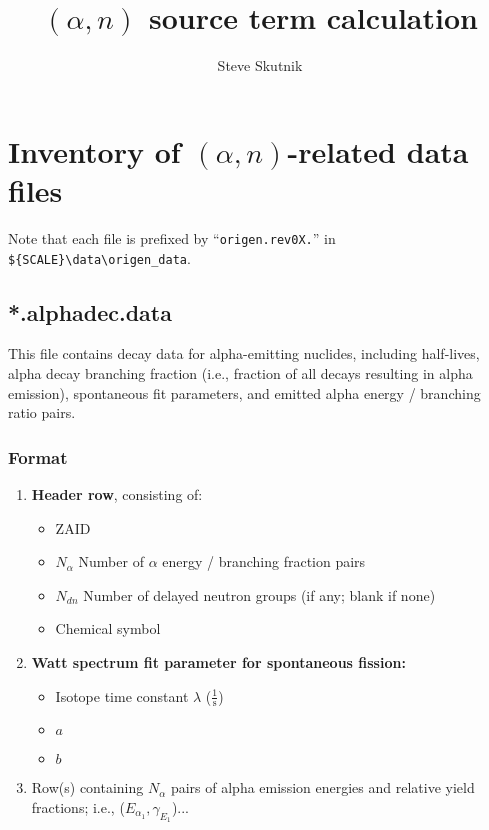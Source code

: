 \documentclass[10pt]{article}
\newcommand{\alphn}[0]{$\left(\alpha,n\right)$}
\begin{document}
\title{$\left( \alpha, n \right)$ source term calculation}
\author{Steve Skutnik}
\maketitle 

\section{Inventory of \alphn-related data files}

Note that each file is prefixed by ``\texttt{origen.rev0X.}'' in \texttt{\$\{SCALE\}\textbackslash data\textbackslash origen\_data}.

\subsection{*.alphadec.data}

This file contains decay data for alpha-emitting nuclides, including half-lives, alpha decay branching fraction (i.e., fraction of all decays resulting in alpha emission), spontaneous fit parameters, and emitted alpha energy / branching ratio pairs.

\subsubsection{Format}
\begin{enumerate}
\item \textbf{Header row}, consisting of:
\begin{itemize}
\item ZAID
\item $N_{\alpha}$ Number of $\alpha$ energy / branching fraction pairs
\item $N_{dn}$ Number of delayed neutron groups (if any; blank if none)
\item Chemical symbol
\end{itemize}
\item \textbf{Watt spectrum fit parameter for spontaneous fission:}
\begin{itemize}
\item Isotope time constant $\lambda$ ($\frac{1}{\mathrm{s}}$)
\item $a$
\item $b$
\end{itemize}
\item Row(s) containing $N_{\alpha}$ pairs of alpha emission energies and relative yield fractions; i.e., ($E_{\alpha_1}, \gamma_{E_1}$)...
\end{enumerate}
\end{document}
